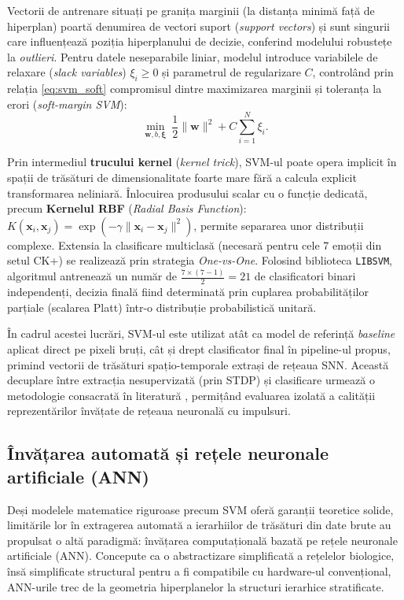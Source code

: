 Vectorii de antrenare situați pe granița marginii (la distanța minimă față de hiperplan) poartă denumirea de vectori suport (\textit{support vectors}) și sunt singurii care influențează poziția hiperplanului de decizie, conferind modelului robustețe la \textit{outlieri}. Pentru datele neseparabile liniar, modelul introduce variabilele de relaxare (\textit{slack variables}) $\xi_i \geq 0$ și parametrul de regularizare $C$, controlând prin relația \eqref{eq:svm_soft} compromisul dintre maximizarea marginii și toleranța la erori (\textit{soft-margin SVM}):
\begin{equation}
	\label{eq:svm_soft}
	\min_{\mathbf{w}, b, \boldsymbol{\xi}}\ \frac{1}{2}\|\mathbf{w}\|^2 + C\sum_{i=1}^{N}\xi_i.
\end{equation}

Prin intermediul \textbf{trucului kernel} (\textit{kernel trick}), SVM-ul poate opera implicit în spații de trăsături de dimensionalitate foarte mare fără a calcula explicit transformarea neliniară. Înlocuirea produsului scalar cu o funcție dedicată, precum \textbf{Kernelul RBF} (\textit{Radial Basis Function}): $K(\mathbf{x}_i, \mathbf{x}_j) = \exp\left(-\gamma \|\mathbf{x}_i - \mathbf{x}_j\|^2\right)$, permite separarea unor distribuții complexe. Extensia la clasificare multiclasă (necesară pentru cele 7 emoții din setul CK+) se realizează prin strategia \textit{One-vs-One}. Folosind biblioteca \texttt{LIBSVM}, algoritmul antrenează un număr de $\frac{7 \times (7 - 1)}{2} = 21$ de clasificatori binari independenți, decizia finală fiind determinată prin cuplarea probabilităților parțiale (scalarea Platt) într-o distribuție probabilistică unitară.

În cadrul acestei lucrări, SVM-ul este utilizat atât ca model de referință \textit{baseline} aplicat direct pe pixeli bruți, cât și drept clasificator final în pipeline-ul propus, primind vectorii de trăsături spațio-temporale extrași de rețeaua SNN. Această decuplare între extracția nesupervizată (prin STDP) și clasificare urmează o metodologie consacrată în literatură \cite{kheradpisheh2018stdp}, permițând evaluarea izolată a calității reprezentărilor învățate de rețeaua neuronală cu impulsuri.

\subsection*{Învățarea automată și rețele neuronale artificiale (ANN)}

Deși modelele matematice riguroase precum SVM oferă garanții teoretice solide, limitările lor în extragerea automată a ierarhiilor de trăsături din date brute au propulsat o altă paradigmă: învățarea computațională bazată pe rețele neuronale artificiale (ANN). Concepute ca o abstractizare simplificată a rețelelor biologice, însă simplificate structural pentru a fi compatibile cu hardware-ul convențional, ANN-urile trec de la geometria hiperplanelor la structuri ierarhice stratificate.

